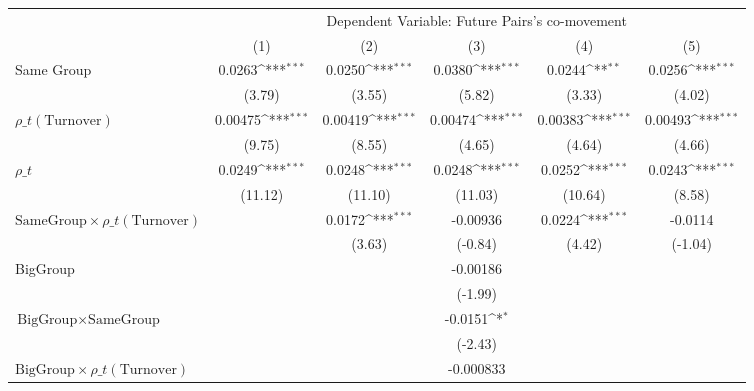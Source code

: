 {
\def\sym#1{\ifmmode^{#1}\else\(^{#1}\)\fi}
\begin{tabular}{l*{5}{c}}
\hline\hline
                &\multicolumn{5}{c}{Dependent Variable: Future Pairs's co-movement}                            \\\cmidrule(lr){2-6}
                &\multicolumn{1}{c}{(1)}         &\multicolumn{1}{c}{(2)}         &\multicolumn{1}{c}{(3)}         &\multicolumn{1}{c}{(4)}         &\multicolumn{1}{c}{(5)}         \\
\hline
Same Group      &   0.0263\sym{***}&   0.0250\sym{***}&   0.0380\sym{***}&   0.0244\sym{**} &   0.0256\sym{***}\\
                &   (3.79)         &   (3.55)         &   (5.82)         &   (3.33)         &   (4.02)         \\
[1em]
 $ {\rho\_t(\text{Turnover})} $ &  0.00475\sym{***}&  0.00419\sym{***}&  0.00474\sym{***}&  0.00383\sym{***}&  0.00493\sym{***}\\
                &   (9.75)         &   (8.55)         &   (4.65)         &   (4.64)         &   (4.66)         \\
[1em]
 $ {\rho\_t} $   &   0.0249\sym{***}&   0.0248\sym{***}&   0.0248\sym{***}&   0.0252\sym{***}&   0.0243\sym{***}\\
                &  (11.12)         &  (11.10)         &  (11.03)         &  (10.64)         &   (8.58)         \\
[1em]
$ {\text{SameGroup} \times  {\rho\_t(\text{Turnover})} } $ &                  &   0.0172\sym{***}& -0.00936         &   0.0224\sym{***}&  -0.0114         \\
                &                  &   (3.63)         &  (-0.84)         &   (4.42)         &  (-1.04)         \\
[1em]
BigGroup        &                  &                  & -0.00186         &                  &                  \\
                &                  &                  &  (-1.99)         &                  &                  \\
[1em]
$ {\text{BigGroup} } \times {\text{SameGroup} }  $ &                  &                  &  -0.0151\sym{*}  &                  &                  \\
                &                  &                  &  (-2.43)         &                  &                  \\
[1em]
$ {\text{BigGroup} } \times  {\rho\_t(\text{Turnover})}  $ &                  &                  &-0.000833         &                  &                  \\

\end{tabular}}
